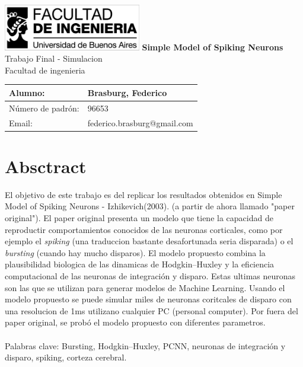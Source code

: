 \documentclass[12pt]{article}
\begin{document}
\begin{titlepage} %
	\hfill\includegraphics[width=6cm]{images/logofiuba.jpg}
    \centering
    \vfill
    \Huge \textbf{Simple Model of Spiking Neurons}
    \vskip2cm
    \Large Trabajo Final - Simulacion \\
    Facultad de ingenieria\\ %
    \vskip2cm
    \begin{tabular}{ | l | l | } %
      \hline
      Alumno: & Brasburg, Federico \\ \hline
      Número de padrón: & 96653 \\ \hline
      Email: & federico.brasburg@gmail.com \\ \hline
    \end{tabular}
    \vskip2cm
    \vfill
    \vfill
\end{titlepage}

\tableofcontents %
\newpage

\section{Absctract}\label{sec:intro}
El objetivo de este trabajo es del replicar los resultados obtenidos en Simple Model of Spiking Neurons - Izhikevich(2003). \cite{paperOriginal} (a partir de ahora llamado "paper original").
El paper original presenta un modelo que tiene la capacidad de reproductir comportamientos conocidos de las neuronas corticales, como por ejemplo el \textit{spiking} (una traduccion bastante desafortunada seria disparada)
o el \textit{bursting} (cuando hay mucho disparos). El modelo propuesto combina la plausibilidad biologica de las dinamicas de Hodgkin–Huxley \cite{HodgkinHuxley} y la eficiencia computacional de las neuronas de integración y disparo.
Estas ultimas neuronas son las que se utilizan para generar modelos de Machine Learning. Usando el modelo propuesto se puede simular miles de neuronas coritcales de disparo con una resolucion de 1ms utilizano cualquier PC (personal computer).
Por fuera del paper original, se probó el modelo propuesto con diferentes parametros.
\\ \\
Palabras clave: Bursting, Hodgkin–Huxley, PCNN, neuronas de integración y disparo, spiking, corteza cerebral.
\newpage
\end{document}
